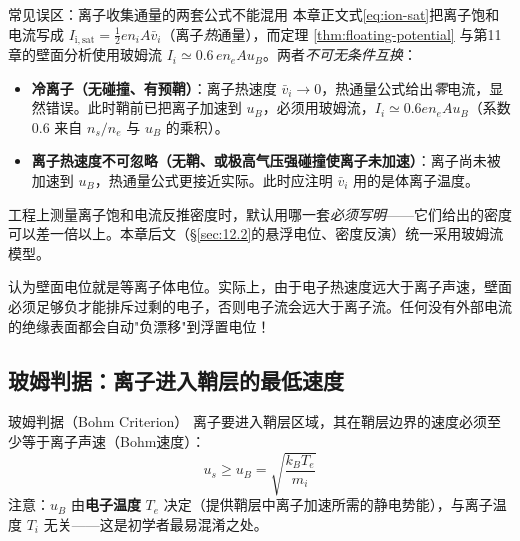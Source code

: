 \documentclass[12pt,a4paper,openany,oneside]{book}
\begin{document}
\begin{warning}{常见误区：离子收集通量的两套公式不能混用}{}
本章正文式\eqref{eq:ion-sat}把离子饱和电流写成 $I_{\mathrm{i,sat}} = \frac{1}{2}en_iA\bar{v}_i$（离子\emph{热}通量），而定理 \ref{thm:floating-potential} 与第11章的壁面分析使用玻姆流 $I_i \simeq 0.6\,en_eAu_B$。两者\emph{不可无条件互换}：
\begin{itemize}
    \item \textbf{冷离子（无碰撞、有预鞘）}：离子热速度 $\bar v_i\to 0$，热通量公式给出\emph{零}电流，显然错误。此时鞘前已把离子加速到 $u_B$，必须用玻姆流，$I_i \simeq 0.6en_eAu_B$（系数 $0.6$ 来自 $n_s/n_e$ 与 $u_B$ 的乘积）。
    \item \textbf{离子热速度不可忽略（无鞘、或极高气压强碰撞使离子未加速）}：离子尚未被加速到 $u_B$，热通量公式更接近实际。此时应注明 $\bar v_i$ 用的是体离子温度。
\end{itemize}
工程上测量离子饱和电流反推密度时，默认用哪一套\emph{必须写明}——它们给出的密度可以差一倍以上。本章后文（\S\ref{sec:12.2}的悬浮电位、密度反演）统一采用玻姆流模型。
\end{warning}

\begin{warning}{}{}
认为壁面电位就是等离子体电位。实际上，由于电子热速度远大于离子声速，壁面必须足够负才能排斥过剩的电子，否则电子流会远大于离子流。任何没有外部电流的绝缘表面都会自动"负漂移"到浮置电位！
\end{warning}

\subsection{玻姆判据：离子进入鞘层的最低速度}

\begin{theorem}{玻姆判据（Bohm Criterion）}{}{}
\label{thm:bohm-criterion}
离子要进入鞘层区域，其在鞘层边界的速度必须至少等于离子声速（Bohm速度）：
\begin{equation}
\label{eq:bohm-criterion}
u_s \ge u_B = \sqrt{\frac{k_B T_e}{m_i}}
\end{equation}
注意：$u_B$ 由\textbf{电子温度} $T_e$ 决定（提供鞘层中离子加速所需的静电势能），与离子温度 $T_i$ 无关——这是初学者最易混淆之处。
\end{theorem}
\end{document}
